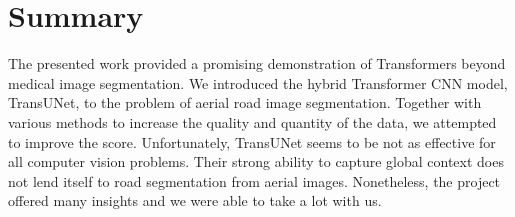 \documentclass[10pt,conference,compsocconf]{IEEEtran}
\begin{document}
\section{Summary}
The presented work provided a promising demonstration of Transformers beyond medical image segmentation. 
We introduced the hybrid Transformer CNN model, TransUNet, to the problem of aerial road image segmentation. Together with various methods to increase the quality and quantity of the data, we attempted to improve the score.
Unfortunately, TransUNet seems to be not as effective for all computer vision problems. Their strong ability to capture global context does not lend itself to road segmentation from aerial images. Nonetheless, the project offered many insights and we were able to take a lot with us. 





\end{document}
